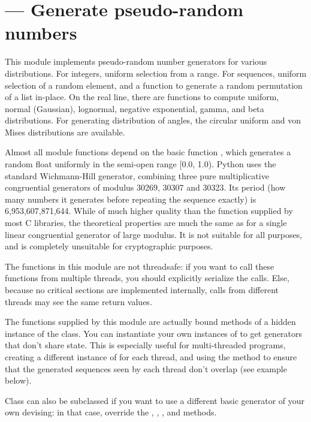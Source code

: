 \section{ ---
         Generate pseudo-random numbers}



This module implements pseudo-random number generators for various
distributions.
For integers, uniform selection from a range.
For sequences, uniform selection of a random element, and a function to
generate a random permutation of a list in-place.
On the real line, there are functions to compute uniform, normal (Gaussian),
lognormal, negative exponential, gamma, and beta distributions.
For generating distribution of angles, the circular uniform and
von Mises distributions are available.

Almost all module functions depend on the basic function
, which generates a random float uniformly in
the semi-open range [0.0, 1.0).  Python uses the standard Wichmann-Hill
generator, combining three pure multiplicative congruential
generators of modulus 30269, 30307 and 30323.  Its period (how many
numbers it generates before repeating the sequence exactly) is
6,953,607,871,644.  While of much higher quality than the 
function supplied by most C libraries, the theoretical properties
are much the same as for a single linear congruential generator of
large modulus.  It is not suitable for all purposes, and is completely
unsuitable for cryptographic purposes.

The functions in this module are not threadsafe:  if you want to call these
functions from multiple threads, you should explicitly serialize the calls.
Else, because no critical sections are implemented internally, calls
from different threads may see the same return values.

The functions supplied by this module are actually bound methods of a
hidden instance of the  class.  You can
instantiate your own instances of  to get generators
that don't share state.  This is especially useful for multi-threaded
programs, creating a different instance of  for each
thread, and using the  method to ensure that the
generated sequences seen by each thread don't overlap (see example
below).

Class  can also be subclassed if you want to use a
different basic generator of your own devising: in that case, override
the , , ,
 and  methods.

